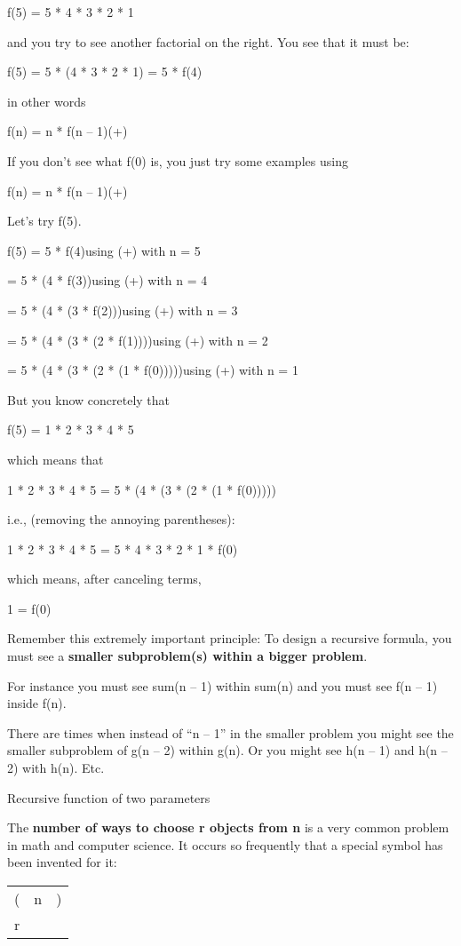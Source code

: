 \documentclass[
]{article}
\begin{document}
f(5) = 5 * 4 * 3 * 2 * 1

and you try to see another factorial on the right. You see that it must
be:

f(5) = 5 * (4 * 3 * 2 * 1) = 5 * f(4)

in other words

f(n) = n * f(n -- 1)(+)

If you don't see what f(0) is, you just try some examples using

f(n) = n * f(n -- 1)(+)

Let's try f(5).

f(5) = 5 * f(4)using (+) with n = 5

= 5 * (4 * f(3))using (+) with n = 4

= 5 * (4 * (3 * f(2)))using (+) with n = 3

= 5 * (4 * (3 * (2 * f(1))))using (+) with n = 2

= 5 * (4 * (3 * (2 * (1 * f(0)))))using (+) with n = 1

But you know concretely that

f(5) = 1 * 2 * 3 * 4 * 5

which means that

1 * 2 * 3 * 4 * 5 = 5 * (4 * (3 * (2 * (1 * f(0)))))

i.e., (removing the annoying parentheses):

1 * 2 * 3 * 4 * 5 = 5 * 4 * 3 * 2 * 1 * f(0)

which means, after canceling terms,

1 = f(0)

Remember this extremely important principle: To design a recursive
formula, you must see a \textbf{smaller subproblem(s) within a bigger
problem}.

For instance you must see sum(n -- 1) within sum(n) and you must see f(n
-- 1) inside f(n).

There are times when instead of ``n -- 1'' in the smaller problem you
might see the smaller subproblem of g(n -- 2) within g(n). Or you might
see h(n -- 1) and h(n -- 2) with h(n). Etc.

Recursive function of two parameters

The \textbf{number of ways to choose r objects from n} is a very common
problem in math and computer science. It occurs so frequently that a
special symbol has been invented for it:

\begin{longtable}[]{@{}lll@{}}
\toprule
\endhead
( & n & )\tabularnewline
r & &\tabularnewline
\bottomrule
\end{longtable}
\end{document}

